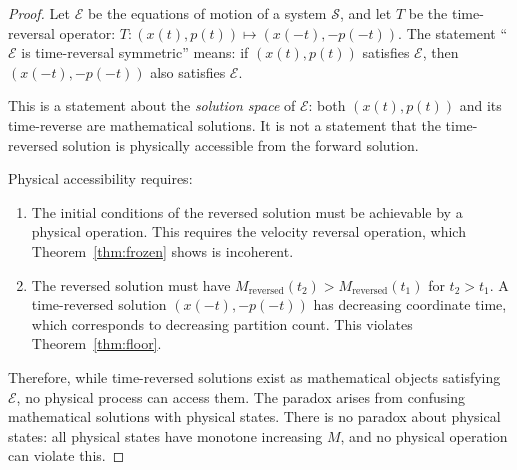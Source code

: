 \documentclass[11pt,twocolumn,a4paper]{article}
\theoremstyle{plain}
\theoremstyle{definition}
\theoremstyle{remark}
\begin{document}
\begin{proof}
Let $\mathcal{E}$ be the equations of motion of a system $\mathcal{S}$, and let
$T$ be the time-reversal operator: $T: (x(t), p(t)) \mapsto (x(-t), -p(-t))$.
The statement ``$\mathcal{E}$ is time-reversal symmetric'' means: if
$(x(t), p(t))$ satisfies $\mathcal{E}$, then $(x(-t), -p(-t))$ also satisfies
$\mathcal{E}$.

This is a statement about the \emph{solution space} of $\mathcal{E}$: both
$(x(t), p(t))$ and its time-reverse are mathematical solutions. It is not a
statement that the time-reversed solution is physically accessible from the
forward solution.

Physical accessibility requires:
\begin{enumerate}
    \item The initial conditions of the reversed solution must be achievable by
          a physical operation. This requires the velocity reversal operation,
          which Theorem~\ref{thm:frozen} shows is incoherent.
    \item The reversed solution must have $M_{\mathrm{reversed}}(t_2) >
          M_{\mathrm{reversed}}(t_1)$ for $t_2 > t_1$. A time-reversed solution
          $(x(-t), -p(-t))$ has decreasing coordinate time, which corresponds
          to decreasing partition count. This violates Theorem~\ref{thm:floor}.
\end{enumerate}
Therefore, while time-reversed solutions exist as mathematical objects
satisfying $\mathcal{E}$, no physical process can access them. The paradox
arises from confusing mathematical solutions with physical states. There is no
paradox about physical states: all physical states have monotone increasing $M$,
and no physical operation can violate this.
\end{proof}
\end{document}
